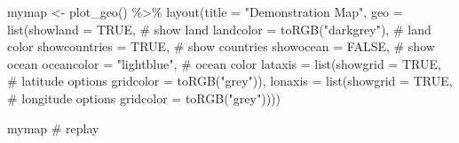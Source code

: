 \documentclass[
  letterpaper,
  DIV=11,
  numbers=noendperiod,
  oneside]{scrreprt}
\newenvironment{Shaded}{\begin{snugshade}}{\end{snugshade}}
\newcommand{\AttributeTok}[1]{\textcolor[rgb]{0.40,0.45,0.13}{#1}}
\newcommand{\CommentTok}[1]{\textcolor[rgb]{0.37,0.37,0.37}{#1}}
\newcommand{\ConstantTok}[1]{\textcolor[rgb]{0.56,0.35,0.01}{#1}}
\newcommand{\FunctionTok}[1]{\textcolor[rgb]{0.28,0.35,0.67}{#1}}
\newcommand{\NormalTok}[1]{\textcolor[rgb]{0.00,0.23,0.31}{#1}}
\newcommand{\OtherTok}[1]{\textcolor[rgb]{0.00,0.23,0.31}{#1}}
\newcommand{\SpecialCharTok}[1]{\textcolor[rgb]{0.37,0.37,0.37}{#1}}
\newcommand{\StringTok}[1]{\textcolor[rgb]{0.13,0.47,0.30}{#1}}
\begin{document}
\begin{Shaded}
\begin{Highlighting}[]
\NormalTok{mymap }\OtherTok{\textless{}{-}} \FunctionTok{plot\_geo}\NormalTok{() }\SpecialCharTok{\%\textgreater{}\%}
  \FunctionTok{layout}\NormalTok{(}\AttributeTok{title =} \StringTok{"Demonstration Map"}\NormalTok{, }
         \AttributeTok{geo =} \FunctionTok{list}\NormalTok{(}\AttributeTok{showland =} \ConstantTok{TRUE}\NormalTok{, }\CommentTok{\# show land}
                    \AttributeTok{landcolor =} \FunctionTok{toRGB}\NormalTok{(}\StringTok{"darkgrey"}\NormalTok{), }\CommentTok{\# land color}
                    \AttributeTok{showcountries =} \ConstantTok{TRUE}\NormalTok{, }\CommentTok{\# show countries}
                    \AttributeTok{showocean =} \ConstantTok{FALSE}\NormalTok{, }\CommentTok{\# show ocean}
                    \AttributeTok{oceancolor =} \StringTok{"lightblue"}\NormalTok{, }\CommentTok{\# ocean color}
                    \AttributeTok{lataxis =} \FunctionTok{list}\NormalTok{(}\AttributeTok{showgrid =} \ConstantTok{TRUE}\NormalTok{, }\CommentTok{\# latitude options}
                                   \AttributeTok{gridcolor =} \FunctionTok{toRGB}\NormalTok{(}\StringTok{"grey"}\NormalTok{)),}
                    \AttributeTok{lonaxis =} \FunctionTok{list}\NormalTok{(}\AttributeTok{showgrid =} \ConstantTok{TRUE}\NormalTok{, }\CommentTok{\# longitude options}
                                   \AttributeTok{gridcolor =} \FunctionTok{toRGB}\NormalTok{(}\StringTok{"grey"}\NormalTok{)))) }

\NormalTok{mymap }\CommentTok{\# replay}
\end{Highlighting}
\end{Shaded}
\end{document}
